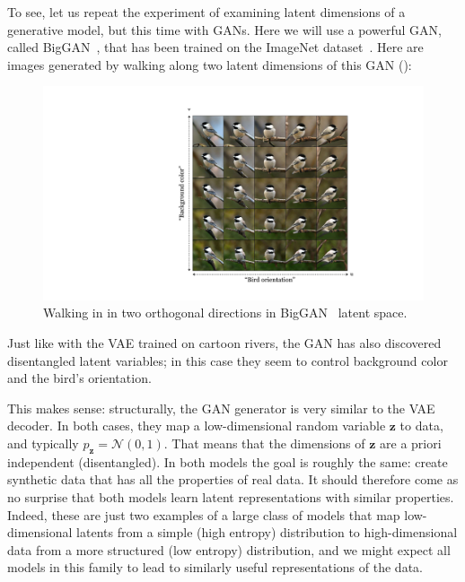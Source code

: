 To see, let us repeat the experiment of examining latent dimensions of a generative model, but this time with GANs. Here we will use a powerful GAN, called BigGAN~\cite{brock2018large}, that has been trained on the ImageNet dataset~\cite{russakovsky2015imagenet}. Here are images generated by walking along two latent dimensions of this GAN (\fig{\ref{fig:generative_modeling_and_representation_learning:biggan_latent_walk}}):
\begin{figure}[h!]
    \centerline{
    \includegraphics[width=0.6\linewidth]{./figures/generative_modeling_and_representation_learning/biggan_latent_walk.pdf}
    }
    \caption{Walking in in two orthogonal directions in BigGAN~\cite{brock2018large} latent space.}
    \label{fig:generative_modeling_and_representation_learning:biggan_latent_walk}
\end{figure}

Just like with the VAE trained on cartoon rivers, the GAN has also discovered disentangled latent variables; in this case they seem to control background color and the bird's orientation.

This makes sense: structurally, the GAN generator is very similar to the VAE decoder. In both cases, they map a low-dimensional random variable $\mathbf{z}$ to data, and typically $p_{\mathbf{z}} = \mathcal{N}(0,1)$. That means that the dimensions of $\mathbf{z}$ are a priori independent (disentangled). In both models the goal is roughly the same: create synthetic data that has all the properties of real data. It should therefore come as no surprise that both models learn latent representations with similar properties. Indeed, these are just two examples of a large class of models that map low-dimensional latents from a simple (high entropy) distribution to high-dimensional data from a more structured (low entropy) distribution, and we might expect all models in this family to lead to similarly useful representations of the data.


